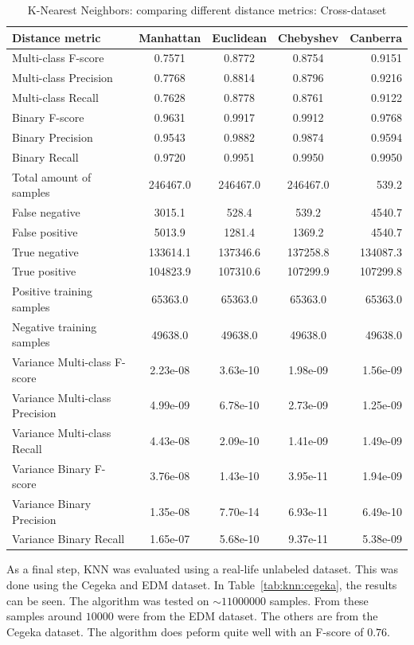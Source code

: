 \begin{table}[H]
\caption{K-Nearest Neighbors: comparing different distance metrics: Cross-dataset}
\label{tab:knn:dis}
\centering
\begin{tabular}{l c c c r}
\toprule
Distance metric & Manhattan & Euclidean & Chebyshev & Canberra \\
\midrule
Multi-class F-score & 0.7571 & 0.8772 & 0.8754 & 0.9151\\
Multi-class Precision & 0.7768 & 0.8814 & 0.8796 & 0.9216\\
Multi-class Recall & 0.7628 & 0.8778 & 0.8761 & 0.9122\\
\midrule
Binary F-score & 0.9631 & 0.9917 & 0.9912 & 0.9768\\
Binary Precision & 0.9543 & 0.9882 & 0.9874 & 0.9594 \\
Binary Recall & 0.9720 & 0.9951 & 0.9950 & 0.9950 \\
\midrule
Total amount of samples & 246467.0 & 246467.0 & 246467.0 & 539.2\\
False negative & 3015.1 & 528.4 & 539.2 & 4540.7 \\
False positive & 5013.9 & 1281.4 & 1369.2 & 4540.7 \\
True negative & 133614.1 & 137346.6 & 137258.8 & 134087.3 \\
True positive & 104823.9 & 107310.6 & 107299.9 & 107299.8\\
\midrule
Positive training samples & 65363.0 & 65363.0 & 65363.0 & 65363.0 \\
Negative training samples & 49638.0 & 49638.0 & 49638.0 & 49638.0\\
\midrule
Variance Multi-class F-score & 2.23e-08 & 3.63e-10 & 1.98e-09 & 1.56e-09\\
Variance Multi-class Precision & 4.99e-09 & 6.78e-10 & 2.73e-09 & 1.25e-09\\
Variance Multi-class Recall & 4.43e-08 & 2.09e-10 & 1.41e-09 &  1.49e-09\\
\midrule
Variance Binary F-score & 3.76e-08 & 1.43e-10 & 3.95e-11 & 1.94e-09\\
Variance Binary Precision & 1.35e-08 & 7.70e-14 & 6.93e-11 & 6.49e-10\\
Variance Binary Recall & 1.65e-07 & 5.68e-10 & 9.37e-11 & 5.38e-09\\
\bottomrule
\end{tabular}
\end{table}

\noindent As a final step, KNN was evaluated using a real-life unlabeled dataset. This was done using the Cegeka and EDM dataset. In Table~\ref{tab:knn:cegeka}, the results can be seen. The algorithm was tested on $\sim11000000$ samples. From these samples around $10000$ were from the EDM dataset. The others are from the Cegeka dataset. The algorithm does peform quite well with an F-score of $0.76$. 

